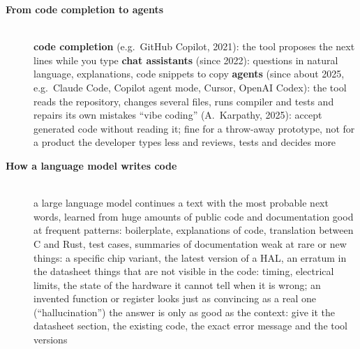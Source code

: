 \begin{description}
\item[{\rot\bf From code completion to agents}]~\\[-\lblskip]
\bi
	\ite \textbf{code completion} (e.g.\ GitHub Copilot, 2021): the tool proposes the next lines while you type
	\ite \textbf{chat assistants} (since 2022): questions in natural language, explanations, code snippets to copy
	\ite \textbf{agents} (since about 2025, e.g.\ Claude Code, Copilot agent mode, Cursor, OpenAI Codex): the tool reads the repository, changes several files, runs compiler and tests and repairs its own mistakes
	\ite ``vibe coding'' (A.\ Karpathy, 2025): accept generated code without reading it; fine for a throw-away prototype, not for a product
	\ite the developer types less and reviews, tests and decides more
\ei
\os{\newpage}

\item[{\rot\bf How a language model writes code}]~\\[-\lblskip]
\bi
	\ite a large language model continues a text with the most probable next words, learned from huge amounts of public code and documentation
	\ite good at frequent patterns: boilerplate, explanations of code, translation between C and Rust, test cases, summaries of documentation
	\ite weak at
	\bi
		\ite rare or new things: a specific chip variant, the latest version of a HAL, an erratum in the datasheet
		\ite things that are not visible in the code: timing, electrical limits, the state of the hardware
		\ite it cannot tell when it is wrong; an invented function or register looks just as convincing as a real one (``hallucination'')
	\ei
	\ite the answer is only as good as the context: give it the datasheet section, the existing code, the exact error message and the tool versions
\ei
\os{\newpage}


\end{description}
